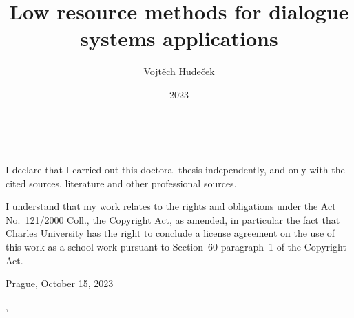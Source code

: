 \documentclass[12pt,notitlepage,a4paper,openright]{report}
\title{Low resource methods for dialogue systems applications}
\author{Vojt{{\v{e}}ch} Hude{\v{c}}ek}
\date{2023}
\begin{document}
%
%
%
\renewcommand{\thepage}{\roman{page}}
\maketitle

\pagestyle{plain}
\normalsize
\setcounter{page}{2}

\cleardoublepage{}
\ \vspace{10mm}

\noindent \it

\vspace{\fill}
\noindent \rm
I declare that I carried out this doctoral thesis independently,
  and only with the cited sources, literature and other professional sources.

I understand that my work relates to the rights and obligations
  under the Act No.~121/2000 Coll., the Copyright Act, as amended,
  in particular the fact that Charles University has the right
  to conclude a license agreement on the use of this work as a school work
  pursuant to Section~60 paragraph~1 of the Copyright Act.

\vspace{2cm}
\noindent Prague, October 15, 2023\hspace{\fill}\theauthor %


\newcommand{\rewrite}[1] {
  {\color{blue}\textbf{TO BE REWRITTEN:} #1}
  }
\newcommand{\todo}[1] {
  {\color{red}\textbf{TODO:} #1}
  }
\newcommand{\VH}[1] {
  {\color{darkgreen}\emph{VH:} #1}
  }

\cleardoublepage{} %
\pagestyle{plain}


\begin{description}[leftmargin=7.5em,labelwidth=7em,labelindent=0em,labelsep=0.5em]
\item[Title:] \thetitle{}
\item[Author:] \theauthor{}
\item[Department:] \thedept{}
\item[Supervisor:] \thesupervisor{},\\ \thedept{}
\end{description}
\end{document}
